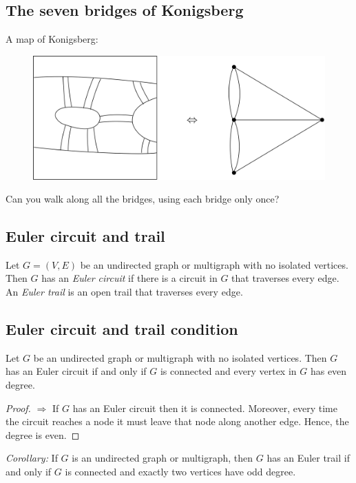 \documentclass[11pt]{article}
\begin{document}
    \subsection{The seven bridges of Konigsberg}

    A map of Konigsberg:
    \begin{figure}[H]
        \centering
        \includegraphics[scale=0.2]{konigsberg.png}
    \end{figure}

    Can you walk along all the bridges, using each bridge only once?

    \subsection{Euler circuit and trail}

    Let \(G = (V,E)\) be an undirected graph or multigraph with no isolated vertices. Then $G$ has an \emph{Euler circuit} if there is a circuit in $G$ that traverses every edge. An \emph{Euler trail} is an open trail that traverses every edge. 

    \subsection{Euler circuit and trail condition}

    Let $G$ be an undirected graph or multigraph with no isolated vertices. Then $G$ has an Euler circuit if and only if $G$ is connected and every vertex in $G$ has even degree.

    \begin{proof}
        \(\Rightarrow\) If $G$ has an Euler circuit then it is connected. Moreover, every time the circuit reaches a node it must leave that node along another edge. Hence, the degree is even.
    \end{proof}

    \emph{Corollary:} If $G$ is an undirected graph or multigraph, then $G$ has an Euler trail if and only if $G$ is connected and exactly two vertices have odd degree.
\end{document}
